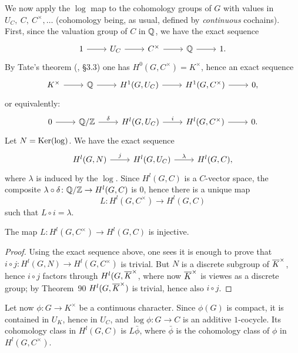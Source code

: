 \begin{subappendices}
We now apply the $\log$ map to the cohomology groups of $G$ with values in
$U_C,~C,~C^\times, \hdots$ (cohomology being, as usual, defined by
\emph{continuous} cochains). First, since the valuation group of $C$ in $\mathbb{Q}$, we
have the exact sequence
\[\begin{tikzcd}
	1 \rar & U_C \rar & C^\times \rar & \Q \rar & 1.
\end{tikzcd}\]
By Tate's theorem (\cite{39}, \S 3.3) one has $H^0(G, C^\times) = K^\times$,
hence an exact sequence
\[\begin{tikzcd}
	K^\times \rar & \Q \rar & H^1(G, U_C) \rar & H^1(G,C^\times) \rar & 0,
\end{tikzcd}\]
\dpage
or equivalently: 
\[\begin{tikzcd}
	0 \rar & \Q / \Z \rar["\delta"] & H^l(G, U_C) \rar["i"] & H^l(G,
	C^\times) \rar & 0.
\end{tikzcd}\]
Let $N = \operatorname{Ker}(\log)$. We have the exact sequence
\[\begin{tikzcd}
	H^l(G,N) \rar["j"] & H^l(G,U_C) \rar["\lambda"] & H^l(G,C),
\end{tikzcd}\]
where $\lambda$ is induced by the $\log$. Since $H^l(G,C)$ is a $C$-vector
space, the composite $\lambda \circ \delta \colon \mathbb{Q} / \mathbb{Z} \to H^l(G,C)$ is $0$,
hence there is a unique map
\[
	L \colon H^l(G,C^\times) \longrightarrow H^l(G,C)  
\]
such that $L \circ i = \lambda$.

\begin{prop}
The map $L \colon H^l(G,C^\times) \to H^l(G,C)$ is injective. 
\end{prop}

\begin{proof}
Using the exact sequence above, one sees it is enough to prove that $i \circ j
\colon H^l(G,N) \to H^l(G,C^\times)$ is trivial. But $N$ is a discrete subgroup
of $\overline{K}^\times$, hence $i \circ j$ factors through $H^l(G,
\overline{K}^\times$, where now $\overline{K}^\times$ is viewes as a discrete group;
by Theorem~90 $H^l(G, \overline{K}^\times)$ is trivial, hence also $i \circ j$.
\end{proof}

Let now $\phi \colon G \to K^\times$ be a continuous character. Since $\phi(G)$
is compact, it is contained in $U_K$, hence in $U_C$, and $\log \phi \colon G
\to C$ is an additive $1$-cocycle. Its cohomology class in $H^l(G,C)$ is
$L\bar{\phi}$, where $\bar{\phi}$ is the cohomology class of $\phi$ in
$H^l(G,C^\times)$.

\dpage


\end{subappendices}
